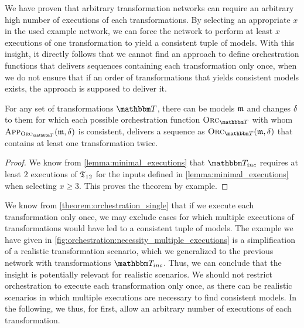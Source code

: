We have proven that arbitrary transformation networks can require an arbitrary high number of executions of each transformations.
By selecting an appropriate $x$ in the used example network, we can force the network to perform at least $x$ executions of one transformation to yield a consistent tuple of models.
With this insight, it directly follows that we cannot find an approach to define orchestration functions that delivers sequences containing each transformation only once, when we do not ensure that if an order of transformations that yields consistent models exists, the approach is supposed to deliver it.

\begin{theorem}
    \label{theorem:orchestration_single}
    For any set of transformations $\transformationset{T}$, there can be models $\mathfrak{m}$ and changes $\mathfrak{\delta}_{}$ to them for which each possible orchestration function $\orcfunction{\transformationset{T}}$ with whom $\appfunction{\orcfunction{\transformationset{T}}}(\modeltuple{m}, \changetuple{})$ is consistent, delivers a sequence as $\orcfunction{\transformationset{T}}(\modeltuple{m}, \changetuple{})$ that contains at least one transformation twice.
\end{theorem}
\begin{proof}
    We know from \autoref{lemma:minimal_executions} that $\transformationset{T}_{inc}$ requires at least $2$ executions of $\mathfrak{T}_{12}$ for the inputs defined in \autoref{lemma:minimal_executions} when selecting $x \geq 3$.
    This proves the theorem by example.
\end{proof}

We know from \autoref{theorem:orchestration_single} that if we execute each transformation only once, we may exclude cases for which multiple executions of transformations would have led to a consistent tuple of models.
The example we have given in \autoref{fig:orchestration:necessity_multiple_executions} is a simplification of a realistic transformation scenario, which we generalized to the previous network with transformations $\transformationset{T}_{inc}$.
Thus, we can conclude that the insight is potentially relevant for realistic scenarios.
We should not restrict orchestration to execute each transformation only once, as there can be realistic scenarios in which multiple executions are necessary to find consistent models.
In the following, we thus, for first, allow an arbitrary number of executions of each transformation.

